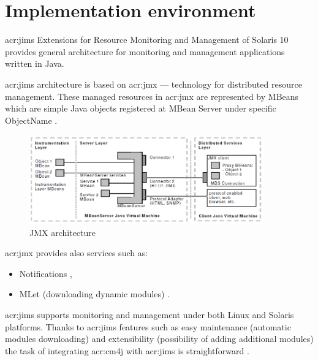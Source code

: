 \documentclass[11pt,openany]{book}
\begin{document}
    \section{Implementation environment}
    \label{sec:impl:env}


      \gls{acr:jims} Extensions for Resource Monitoring and Management of Solaris 10 provides general architecture for
      monitoring and management applications written in Java.

      \gls{acr:jims} architecture is based on \gls{acr:jmx} --- technology for distributed resource
      management.  These managed resources in \gls{acr:jmx} are represented by MBeans which are simple Java objects
      registered at MBean Server under specific ObjectName \cite{jims}.
    
      \begin{figure}[H]
        \begin{center}
          \includegraphics[width=0.9\textwidth]{img/jims/jmx.png}
        \end{center}


        \caption{JMX architecture \cite{jims}}
      \end{figure}
	
      \gls{acr:jmx} provides also services such as:

      \begin{itemize}
        \item Notifications ,
        \item MLet (downloading dynamic modules) .
      \end{itemize}
	
      \gls{acr:jims} supports monitoring and management under both Linux and Solaris platforms. Thanks to \gls{acr:jims}
      features such as easy maintenance (automatic modules downloading) and extensibility (possibility of adding
      additional modules) the task of integrating \gls{acr:cm4j} with \gls{acr:jims} is straightforward \cite{jims}.
    
\end{document}
